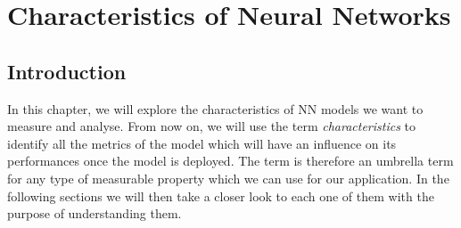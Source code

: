 \chapter{Characteristics of Neural Networks}\label{char_nn}
\section{Introduction}
In this chapter, we will explore the characteristics of NN models we want to measure and analyse. From now on, we will use the term \textit{characteristics} to identify all the metrics of the model which will have an influence on its performances once the model is deployed. The term is therefore an umbrella term for any type of measurable property which we can use for our application. In the following sections we will then take a closer look to each one of them with the purpose of understanding them. 

